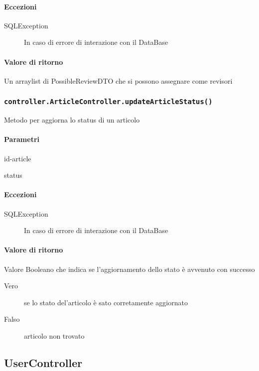 \paragraph{Eccezioni}
\begin{description}
\item[SQLException] In caso di errore di interazione con il DataBase
\end{description}
\paragraph{Valore di ritorno}
Un arraylist di PossibleReviewDTO che si possono assegnare come revisori


\subsubsection{\texttt{controller.ArticleController.updateArticleStatus()}}
Metodo per aggiorna lo status di un articolo
\paragraph{Parametri}
\begin{description}
\item id-article
\item status
\end{description}
\paragraph{Eccezioni}
\begin{description}
\item[SQLException] In caso di errore di interazione con il DataBase
\end{description}
\paragraph{Valore di ritorno}
Valore Booleano che indica se l'aggiornamento dello stato è avvenuto con successo
\begin{description}
\item[Vero] se lo stato del'articolo è sato corretamente aggiornato
\item[Falso] articolo non trovato
\end{description}



\subsection{UserController}
